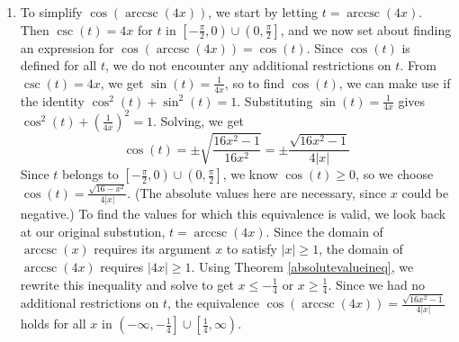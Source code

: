 {\begin{enumerate}
\begin{enumerate}
\[ 
\tan(t) = \left\{\begin{array}{rr} \sqrt{x^2-1}, & \text{ if } 0 \leq t < \frac{\pi}{2} \\ [5pt] -\sqrt{x^2-1}, & \text{ if } \frac{\pi}{2} < t \leq \pi  \end{array}\right. 
\]

Now we need to determine what these conditions on $t$ mean for $x$.  Since $x = \sec(t)$, when $0 \leq t < \frac{\pi}{2}$, $x \geq 1$, and when $\frac{\pi}{2} < t \leq \pi$, $x \leq -1$.  Since we encountered no further restrictions on $t$, the  equivalence below holds for all $x$ in $(-\infty, -1] \cup [1, \infty)$.

\[ \tan(\operatorname{arcsec}(x)) = \left\{ \begin{array}{rr} \sqrt{x^2-1}, & \text{if $x \geq 1$} \\[5pt]  -\sqrt{x^2-1}, & \text{if $x \leq -1$}  \end{array}\right. \]



\item  To simplify $\cos(\operatorname{arccsc}(4x))$, we start by letting $t = \operatorname{arccsc}(4x)$.   Then $\csc(t) = 4x$ for $t$ in $\left[-\frac{\pi}{2}, 0 \right) \cup \left(0, \frac{\pi}{2}\right]$, and we now set about finding an expression for  $\cos(\operatorname{arccsc}(4x)) = \cos(t)$.  Since $\cos(t)$ is defined for all $t$, we do not encounter any additional restrictions on $t$.  From $\csc(t) = 4x$, we get $\sin(t) = \frac{1}{4x}$, so to find $\cos(t)$, we can make use if the identity $\cos^{2}(t) + \sin^{2}(t) = 1$.  Substituting $\sin(t) = \frac{1}{4x}$  gives $\cos^{2}(t) + \left(\frac{1}{4x}\right)^2 = 1$.  Solving, we get \[\cos(t) = \pm \sqrt{\frac{16x^2-1}{16x^2}} = \pm \frac{\sqrt{16x^2-1}}{4|x|}\]  Since $t$ belongs to $\left[-\frac{\pi}{2}, 0 \right) \cup \left(0, \frac{\pi}{2}\right]$, we know $\cos(t) \geq 0$, so we choose $\cos(t) = \frac{\sqrt{16-x^2}}{4|x|}$. (The absolute values here are necessary, since $x$ could be negative.)  To find the values for which this equivalence is valid, we look back at our original substution,  $t = \operatorname{arccsc}(4x)$.  Since the domain of $\operatorname{arccsc}(x)$ requires its argument $x$ to satisfy $|x| \geq 1$, the domain of $\operatorname{arccsc}(4x)$ requires $|4x| \geq 1$.  Using Theorem \ref{absolutevalueineq}, we rewrite this inequality and solve to get $x \leq -\frac{1}{4}$ or $x \geq \frac{1}{4}$.  Since we had no additional restrictions on $t$, the equivalence  $\cos(\operatorname{arccsc}(4x)) = \frac{\sqrt{16x^2-1}}{4|x|}$  holds for all $x$ in $\left(-\infty, -\frac{1}{4} \right] \cup \left[\frac{1}{4}, \infty \right)$.  

\end{enumerate}

\end{enumerate}
}

